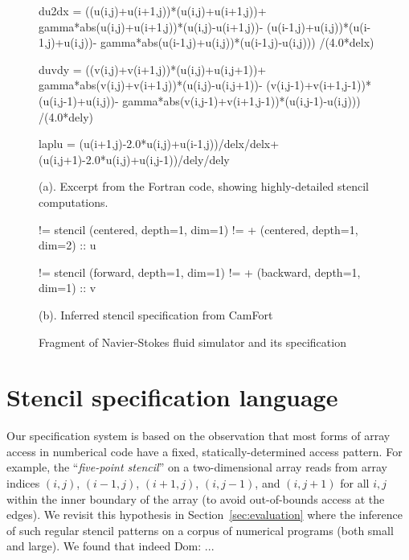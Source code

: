 \documentclass[9pt]{sigplanconf}
\newcommand{\dnote}[1]{\textcolor{darkpurple}{Dom: #1}}
\theoremstyle{definition}
\begin{document}
\begin{figure}
\begin{ExmVerbatim}[firstnumber=20]
du2dx = ((u(i,j)+u(i+1,j))*(u(i,j)+u(i+1,j))+
    gamma*abs(u(i,j)+u(i+1,j))*(u(i,j)-u(i+1,j))-
    (u(i-1,j)+u(i,j))*(u(i-1,j)+u(i,j))-
    gamma*abs(u(i-1,j)+u(i,j))*(u(i-1,j)-u(i,j)))
    /(4.0*delx)

duvdy = ((v(i,j)+v(i+1,j))*(u(i,j)+u(i,j+1))+
   gamma*abs(v(i,j)+v(i+1,j))*(u(i,j)-u(i,j+1))-
   (v(i,j-1)+v(i+1,j-1))*(u(i,j-1)+u(i,j))-
   gamma*abs(v(i,j-1)+v(i+1,j-1))*(u(i,j-1)-u(i,j)))
   /(4.0*dely)

laplu = (u(i+1,j)-2.0*u(i,j)+u(i-1,j))/delx/delx+
          (u(i,j+1)-2.0*u(i,j)+u(i,j-1))/dely/dely
\end{ExmVerbatim}
(a). Excerpt from the Fortran code,
showing highly-detailed stencil computations. \\


\begin{SpecVerbatim}[xleftmargin=0.3cm]
!=   stencil (centered, depth=1, dim=1)
!=         + (centered, depth=1, dim=2) :: u

!=   stencil (forward, depth=1, dim=1)
!=         + (backward, depth=1, dim=1) :: v
\end{SpecVerbatim}
(b). Inferred stencil specification from CamFort
\caption{Fragment of Navier-Stokes fluid simulator and its specification}
\label{ref:navier-stokes-fragment}
\end{figure}

\section{Stencil specification language}
\label{sec:lang}

Our specification system is based on the observation
that most forms of array access in numberical code have
a fixed, statically-determined access pattern. For example, the
``\emph{five-point stencil}'' on a two-dimensional array reads from array
indices $(i, j)$, $(i-1, j)$, $(i+1, j)$, $(i, j-1)$, and $(i, j+1)$
for all $i, j$ within the inner boundary of the array (to avoid
out-of-bounds access at the edges). We revisit this hypothesis
in Section~\ref{sec:evaluation} where the inference of
such regular stencil patterns on a corpus of numerical programs (both
small and large). We found that indeed \dnote{..}.
\end{document}
